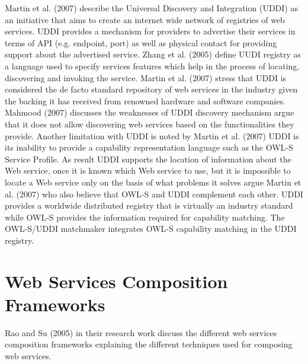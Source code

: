 \documentclass{article}
\begin{document}
Martin et al. (2007) describe the Universal Discovery and Integration (UDDI) as an initiative that aims to create an internet wide network of registries of web services. UDDI provides a mechanism for providers to advertise their services in terms of API (e.g. endpoint, port) as well as physical contact for providing support about the advertised service. Zhang et al. (2005) define UUDI registry as a language used to specify services features which help in the process of locating, discovering and invoking the service. Martin et al. (2007) stress that UDDI is considered the de facto standard repository of web services in the industry given the backing it has received from renowned hardware and software companies. Mahmood (2007) discusses the weaknesses of UDDI discovery mechanism argue that it does not allow discovering web services based on the functionalities they provide. Another limitation with UDDI is noted by Martin et al. (2007) UDDI is its inability to provide a capability representation language such as the OWL-S Service Profile. As result UDDI supports the location of information about the Web service, once it is known which Web service to use, but it is impossible to locate a Web service only on the basis of what problems it solves argue Martin et al. (2007) who also believe that OWL-S and UDDI complement each other. UDDI provides a worldwide distributed registry that is virtually an industry standard while OWL-S provides the information required for capability matching. The OWL-S/UDDI matchmaker integrates OWL-S capability matching in the UDDI registry. 

\section{Web Services Composition Frameworks}

Rao and Su (2005) in their research work discuss the different web services composition frameworks explaining the different techniques used for composing web services.
\end{document}
